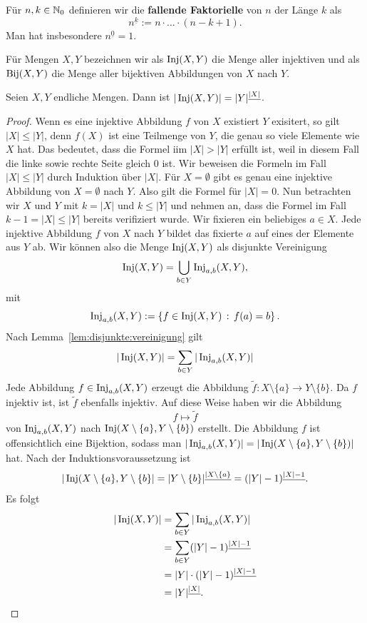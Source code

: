 \begin{defn}
	Für $n, k \in \mathbb{N}_0$ definieren wir die \textbf{fallende Faktorielle} von $n$ der Länge $k$ als
	\[
		n^{\underline{k}} := n \cdot \ldots \cdot (n-k+1).
	\]
	Man hat insbesondere $n^{\underline{0}}=1$. 
\end{defn} 

\begin{defn}
	Für Mengen $X, Y$ bezeichnen wir als $\operatorname{Inj}(X,Y)$ die Menge aller injektiven und als $\operatorname{Bij}(X,Y)$ die Menge aller bijektiven Abbildungen von $X$ nach $Y$. 
\end{defn} 

\begin{thm} \label{thm:inj:abbildungen}
	Seien $X,Y$ endliche Mengen. Dann ist $|\operatorname{Inj}(X,Y) | = |Y|^{\underline{|X|}}$. 
\end{thm} 
\begin{proof} 
	Wenn es eine injektive Abbildung $f$ von $X$ existiert $Y$ exisitert, so gilt $|X| \le |Y|$, denn $f(X)$ ist eine Teilmenge von $Y$, die genau so viele Elemente wie $X$ hat. Das bedeutet, dass die Formel iim $|X| > |Y|$ erfüllt ist, weil in diesem Fall die linke sowie rechte Seite gleich $0$ ist. Wir beweisen die Formeln im Fall $|X| \le |Y|$ durch Induktion über $|X|$. Für $X = \emptyset$ gibt es genau eine injektive Abbildung von $X= \emptyset$ nach $Y$. Also gilt die Formel für $|X|=0$. 
	Nun betrachten wir $X$ und $Y$ mit $k=|X|$ und $k \le |Y|$ und nehmen an, dass die Formel im Fall $k-1=|X| \le |Y|$ bereits verifiziert wurde. Wir fixieren ein beliebiges $a \in X$. Jede injektive Abbildung $f$ von $X$ nach $Y$ bildet das fixierte $a$ auf eines der Elemente aus $Y$ ab. Wir können also die Menge $\operatorname{Inj}(X,Y)$ als disjunkte Vereinigung 
	\[
			\operatorname{Inj}(X,Y) = \bigcup_{b \in Y} \operatorname{Inj}_{a,b}(X,Y),
	\]
	mit 
	\[
		\operatorname{Inj}_{a,b} (X,Y) := \left\{  f \in \operatorname{Inj}(X,Y) \,:\, f(a) = b \right\}. 
	\]
	Nach Lemma~\ref{lem:disjunkte:vereinigung} gilt 
	\[
			|\operatorname{Inj}(X,Y)| = \sum_{b \in Y} |\operatorname{Inj}_{a,b}(X,Y)|
	\]
	Jede Abbildung $f  \in \operatorname{Inj}_{a,b}(X,Y)$ erzeugt die Abbildung $\tilde{f} : X \setminus \{a\} \to Y \setminus \{b\}$. Da $f$ injektiv ist, ist $\tilde{f}$ ebenfalls injektiv. Auf diese Weise haben wir die Abbildung 
	\[
				f \mapsto \tilde{f} 
	\]
	von $\operatorname{Inj}_{a,b}(X,Y)$ nach $\operatorname{Inj}(X \setminus \{a\}, Y \setminus \{b\})$ erstellt. Die Abbildung $f$ ist offensichtlich eine Bijektion, sodass man $|\operatorname{Inj}_{a,b}(X,Y)| = |\operatorname{Inj}(X \setminus \{a\},Y \setminus \{b\})|$ hat. Nach der Induktionsvoraussetzung ist 
	\[
		|\operatorname{Inj}(X \setminus \{a\}, Y \setminus \{b\} | = |Y \setminus \{b\}|^{\underline{|X \setminus \{a\}}} = (|Y| -1)^{\underline{|X|-1}}.
	\] 
	Es folgt 
	\begin{align*}
	|\operatorname{Inj}(X,Y)| & = \sum_{b \in Y} |\operatorname{Inj}_{a,b}(X,Y)| 
		\\ & = \sum_{b \in Y} (|Y| -1)^{\underline{|X|-1}} 
		\\ & = |Y| \cdot (|Y| -1)^{\underline{|X|-1}}
		\\ & = |Y|^{\underline{|X|}}. 
	\end{align*}
\end{proof} 

